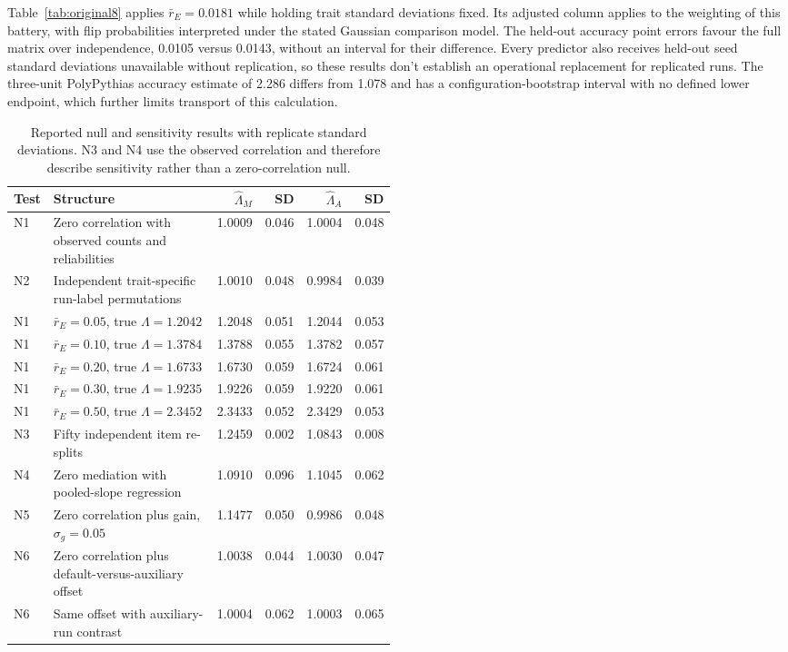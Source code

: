Table~\ref{tab:original8} applies $\bar r_E=0.0181$ while holding trait standard deviations fixed. Its adjusted column applies to the weighting of this battery, with flip probabilities interpreted under the stated Gaussian comparison model. The held-out accuracy point errors favour the full matrix over independence, 0.0105 versus 0.0143, without an interval for their difference. Every predictor also receives held-out seed standard deviations unavailable without replication, so these results don't establish an operational replacement for replicated runs. The three-unit PolyPythias accuracy estimate of 2.286 differs from 1.078 and has a configuration-bootstrap interval with no defined lower endpoint, which further limits transport of this calculation.

\begin{table}[!htb]
\centering
\caption{Reported null and sensitivity results with replicate standard deviations. N3 and N4 use the observed correlation and therefore describe sensitivity rather than a zero-correlation null.}
\label{tab:original9}
\small\setlength{\tabcolsep}{4pt}\renewcommand{\arraystretch}{1.12}
\begin{tabular}{lL{0.49\linewidth}rrrr}\toprule
Test & Structure & $\widehat\Lambda_M$ & SD & $\widehat\Lambda_A$ & SD\\\midrule
N1 & Zero correlation with observed counts and reliabilities & 1.0009 & 0.046 & 1.0004 & 0.048\\
N2 & Independent trait-specific run-label permutations & 1.0010 & 0.048 & 0.9984 & 0.039\\
N1 & $\bar r_E=0.05$, true $\Lambda=1.2042$ & 1.2048 & 0.051 & 1.2044 & 0.053\\
N1 & $\bar r_E=0.10$, true $\Lambda=1.3784$ & 1.3788 & 0.055 & 1.3782 & 0.057\\
N1 & $\bar r_E=0.20$, true $\Lambda=1.6733$ & 1.6730 & 0.059 & 1.6724 & 0.061\\
N1 & $\bar r_E=0.30$, true $\Lambda=1.9235$ & 1.9226 & 0.059 & 1.9220 & 0.061\\
N1 & $\bar r_E=0.50$, true $\Lambda=2.3452$ & 2.3433 & 0.052 & 2.3429 & 0.053\\
N3 & Fifty independent item re-splits & 1.2459 & 0.002 & 1.0843 & 0.008\\
N4 & Zero mediation with pooled-slope regression & 1.0910 & 0.096 & 1.1045 & 0.062\\
N5 & Zero correlation plus gain, $\sigma_g=0.05$ & 1.1477 & 0.050 & 0.9986 & 0.048\\
N6 & Zero correlation plus default-versus-auxiliary offset & 1.0038 & 0.044 & 1.0030 & 0.047\\
N6 & Same offset with auxiliary-run contrast & 1.0004 & 0.062 & 1.0003 & 0.065\\\bottomrule
\end{tabular}
\end{table}


